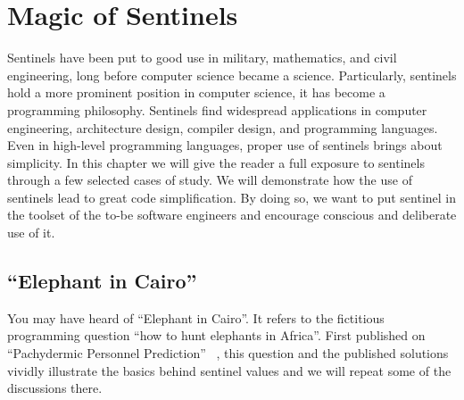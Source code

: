 
\chapter{Magic of Sentinels} \label{ch:sentinels}
Sentinels have been put to good use in military, mathematics, and civil engineering, long before
computer science became a science.
Particularly, sentinels hold a more prominent position in computer science,
it has become a programming philosophy.
Sentinels find widespread applications in computer engineering, architecture design,
compiler design, and programming languages.
Even in high-level programming languages, proper use of sentinels brings about
simplicity.
In this chapter we will give the reader a full exposure to sentinels through a few selected cases
of study.
We will demonstrate how the use of sentinels lead to great code simplification.
By doing so, we want to put sentinel in the toolset of the to-be software engineers and encourage
conscious and deliberate use of it.


\section{``Elephant in Cairo''}\label{sec:elephant-in-cairo}

You may have heard of ``Elephant in Cairo''.
It refers to the fictitious programming question ``how to hunt elephants in Africa''.
First published on ``Pachydermic Personnel Prediction'' ~\cite{elephant-in-Cairo:1989},
this question and the published solutions vividly illustrate the basics
behind sentinel values and we will repeat some of the discussions there.


